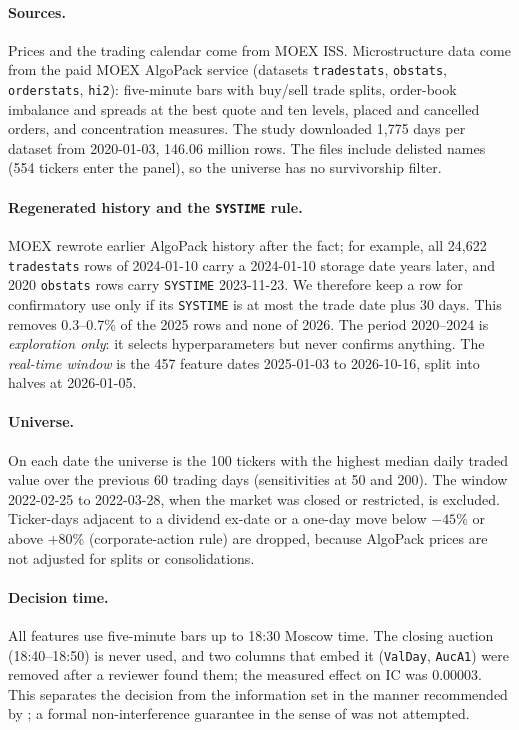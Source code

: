 \documentclass[11pt]{article}
\begin{document}
\paragraph{Sources.} Prices and the trading calendar come from MOEX ISS. Microstructure data come from the paid MOEX AlgoPack service (datasets \texttt{tradestats}, \texttt{obstats}, \texttt{orderstats}, \texttt{hi2}): five-minute bars with buy/sell trade splits, order-book imbalance and spreads at the best quote and ten levels, placed and cancelled orders, and concentration measures. The study downloaded 1{,}775 days per dataset from 2020-01-03, 146.06 million rows. The files include delisted names (554 tickers enter the panel), so the universe has no survivorship filter.

\paragraph{Regenerated history and the \texttt{SYSTIME} rule.} MOEX rewrote earlier AlgoPack history after the fact; for example, all 24{,}622 \texttt{tradestats} rows of 2024-01-10 carry a 2024-01-10 storage date years later, and 2020 \texttt{obstats} rows carry \texttt{SYSTIME} 2023-11-23. We therefore keep a row for confirmatory use only if its \texttt{SYSTIME} is at most the trade date plus 30 days. This removes 0.3--0.7\% of the 2025 rows and none of 2026. The period 2020--2024 is \emph{exploration only}: it selects hyperparameters but never confirms anything. The \emph{real-time window} is the 457 feature dates 2025-01-03 to 2026-10-16, split into halves at 2026-01-05.

\paragraph{Universe.} On each date the universe is the 100 tickers with the highest median daily traded value over the previous 60 trading days (sensitivities at 50 and 200). The window 2022-02-25 to 2022-03-28, when the market was closed or restricted, is excluded. Ticker-days adjacent to a dividend ex-date or a one-day move below $-45\%$ or above $+80\%$ (corporate-action rule) are dropped, because AlgoPack prices are not adjusted for splits or consolidations.

\paragraph{Decision time.} All features use five-minute bars up to 18:30 Moscow time. The closing auction (18:40--18:50) is never used, and two columns that embed it (\texttt{ValDay}, \texttt{AucA1}) were removed after a reviewer found them; the measured effect on IC was 0.00003. This separates the decision from the information set in the manner recommended by \citet{zhang2026alpha}; a formal non-interference guarantee in the sense of \citet{fonseca2026lookahead} was not attempted.
\end{document}
